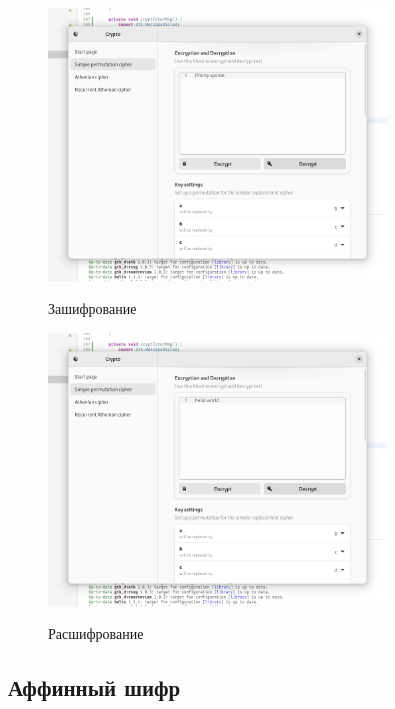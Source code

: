 \documentclass[a4paper]{article}
\begin{document}
  \begin{figure}[H]  
    \centering
    \caption{Зашифрование}
    \includegraphics[width=0.8\textwidth]{01_0004}
    \label{img:0004}
  \end{figure}

  \begin{figure}[H]  
    \centering
    \caption{Расшифрование}
    \includegraphics[width=0.8\textwidth]{01_0005}
    \label{img:0005}
  \end{figure}

  \subsection{Аффинный шифр}
\end{document}
